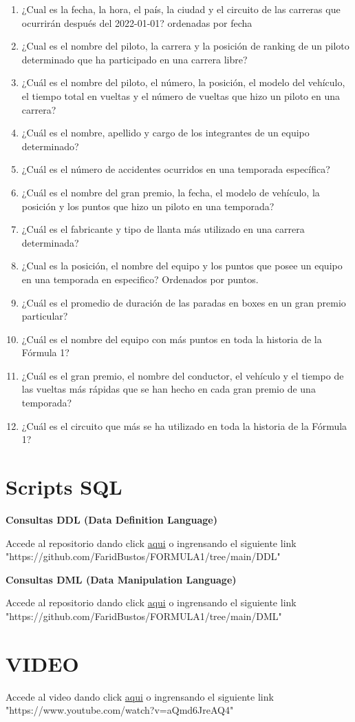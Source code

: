 \documentclass{article}
\begin{document}
\begin{enumerate}
		\item ¿Cual es la fecha, la hora, el país, la ciudad y el circuito de las carreras que ocurrirán después del 2022-01-01? ordenadas por fecha
		\item ¿Cual es el nombre del piloto, la carrera y la posición de ranking de un piloto determinado que ha participado en una carrera libre?
		\item ¿Cuál es el nombre del piloto, el número, la posición, el modelo del vehículo, el tiempo total en vueltas y el número de vueltas que hizo un piloto en una carrera?
		\item ¿Cuál es el nombre, apellido y cargo de los integrantes de un equipo determinado?
		\item ¿Cuál es el número de accidentes ocurridos en una temporada específica?
		\item ¿Cuál es el nombre del gran premio, la fecha, el modelo de vehículo, la posición y los puntos que hizo un piloto en una temporada?
		\item ¿Cuál es el fabricante y tipo de llanta más utilizado en una carrera determinada?
		\item ¿Cual es la posición, el nombre del equipo y los puntos que posee un equipo en una temporada en especifico? Ordenados por puntos.
		\item ¿Cuál es el promedio de duración de las paradas en boxes en un gran premio particular?
		\item ¿Cuál es el nombre del equipo con más puntos en toda la historia de la Fórmula 1?
		\item ¿Cuál es el gran premio, el nombre del conductor, el vehículo y el tiempo de las vueltas más rápidas que se han hecho en cada gran premio de una temporada?
		\item ¿Cuál es el circuito que más se ha utilizado en toda la historia de la Fórmula 1?
		
	\end{enumerate}
	
	\section{Scripts SQL}
	\Large{\textbf{Consultas DDL (Data Definition Language)}} \par
	
	
		\textnormal{Accede al repositorio dando click \href{https://github.com/FaridBustos/FORMULA1/tree/main/DDL}{aqui}  o ingrensando el siguiente link "https://github.com/FaridBustos/FORMULA1/tree/main/DDL"}
	
	
	\Large{\textbf{Consultas DML (Data Manipulation Language)}} \par
	\textnormal{Accede al repositorio dando click \href{https://github.com/FaridBustos/FORMULA1/tree/main/DML}{aqui} o ingrensando el siguiente link "https://github.com/FaridBustos/FORMULA1/tree/main/DML"}
	
	\section{VIDEO}
	\textnormal{Accede al video dando click \href{https://www.youtube.com/watch?v=aQmd6JreAQ4}{aqui} o ingrensando el siguiente link "https://www.youtube.com/watch?v=aQmd6JreAQ4"}
	
\end{document}

